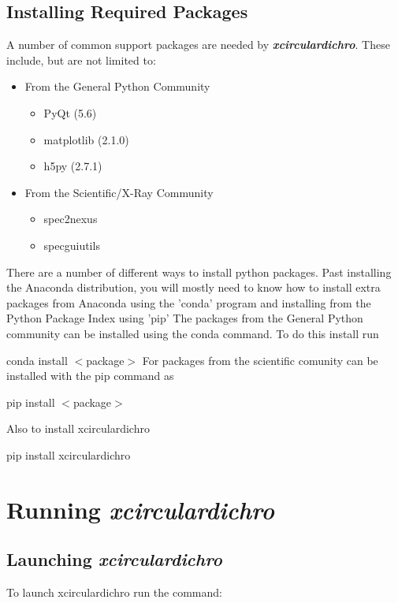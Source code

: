 \documentclass[12pt,letterpaper, openany]{book}
\begin{document}
\section{Installing Required Packages}
A number of common support packages are needed by \textbf{\textit{xcirculardichro}}.  These include, but are not limited to:

\begin{itemize}
\itemsep0em
\item From the General Python Community

\begin{itemize}
\itemsep0em
\item PyQt (5.6)
\item matplotlib (2.1.0)
\item h5py (2.7.1)
\end{itemize}

\item From the Scientific/X-Ray Community

\begin{itemize}
\itemsep0em
\item spec2nexus
\item specguiutils
\end{itemize}

\end{itemize}

\noindent
There are a number of different ways to install python packages.  Past
installing the Anaconda distribution, you will mostly need to know how to
install extra packages from Anaconda using the 'conda' program and installing
from the Python Package Index\cite{PYTHONPACKAGEINDEX} using 'pip'
The packages from the General Python community can be installed using the conda
command.  To do this install run

conda install $<$package$>$
\newline
\noindent
For packages from the scientific comunity can be installed with the pip command
as

pip install $<$package$>$


\noindent
Also to install xcirculardichro

pip install xcirculardichro

\chapter{Running \textbf{\textit{xcirculardichro}}}

\section{Launching \textbf{\textit{xcirculardichro}}}
To launch xcirculardichro run the command:
\end{document}

